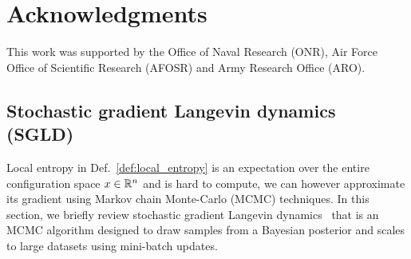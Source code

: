 \documentclass[10pt]{article}
\begin{document}
\section{Acknowledgments}
\label{s:acknowledgements}

This work was supported by the Office of Naval Research (ONR), Air Force Office of Scientific Research (AFOSR) and Army Research Office (ARO).

{
\footnotesize
\linespread{0.8}


}

\begin{appendices}

\renewcommand\thetable{\thesection\arabic{table}}
\renewcommand\thefigure{\thesection\arabic{figure}}

\section{Stochastic gradient Langevin dynamics (SGLD)}
\label{s:app:langevin}

Local entropy in Def.~\eqref{def:local_entropy} is an expectation over the entire configuration space $x \in \mathbb{R}^n$ and is hard to compute, we can however approximate its gradient using Markov chain Monte-Carlo (MCMC) techniques. In this section, we briefly review stochastic gradient Langevin dynamics~\citep{welling2011bayesian} that is an MCMC algorithm designed to draw samples from a Bayesian posterior and scales to large datasets using mini-batch updates.


\end{appendices}
\end{document}
